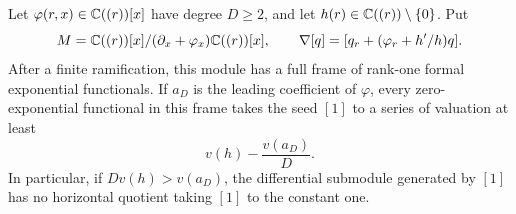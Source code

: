 \begin{theorem}\label{thm:stationaryballs}
Let $\varphi(r,x)\in\mathbb C((r))[x]$ have degree $D\geq2$, and let
$h(r)\in\mathbb C((r))\setminus\{0\}$. Put
\[
 M=\mathbb C((r))[x]/(\partial_x+\varphi_x)\mathbb C((r))[x],\qquad
 \nabla[q]=[q_r+(\varphi_r+h'/h)q].
\]
After a finite ramification, this module has a full frame of rank-one
formal exponential functionals. If $a_D$ is the leading coefficient
of $\varphi$, every zero-exponential functional in this frame takes
the seed $[1]$ to a series of valuation at least
\begin{equation}\label{eq:valuationbound}
 v(h)-\frac{v(a_D)}D.
\end{equation}
In particular, if $Dv(h)>v(a_D)$, the differential submodule generated
by $[1]$ has no horizontal quotient taking $[1]$ to the constant one.
\end{theorem}

